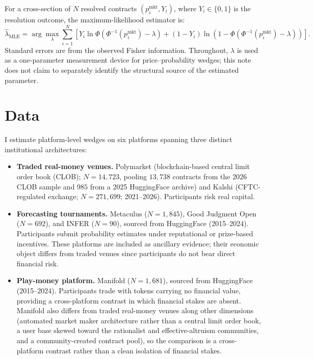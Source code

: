 \documentclass[12pt]{article}
\begin{document}
For a cross-section of $N$ resolved contracts $(p_i^{\mathrm{mkt}}, Y_i)$, where $Y_i \in \{0,1\}$ is the resolution outcome, the maximum-likelihood estimator is:
\[
\hat\lambda_{\mathrm{MLE}} = \arg\max_\lambda \sum_{i=1}^N \left[ Y_i \ln \Phi\!\left(\Phi^{-1}(p_i^{\mathrm{mkt}}) - \lambda\right) + (1 - Y_i) \ln\!\left(1 - \Phi\!\left(\Phi^{-1}(p_i^{\mathrm{mkt}}) - \lambda\right)\right) \right].
\]
Standard errors are from the observed Fisher information. Throughout, $\lambda$ is used as a one-parameter measurement device for price--probability wedges; this note does not claim to separately identify the structural source of the estimated parameter.

\section{Data}

I estimate platform-level wedges on six platforms spanning three distinct institutional architectures:

\begin{itemize}
\item \textbf{Traded real-money venues.} Polymarket (blockchain-based central limit order book (CLOB); $N = 14{,}723$, pooling $13{,}738$ contracts from the 2026 CLOB sample and $985$ from a 2025 HuggingFace archive) and Kalshi (CFTC-regulated exchange; $N = 271{,}699$; 2021--2026). Participants risk real capital.

\item \textbf{Forecasting tournaments.} Metaculus ($N = 1{,}845$), Good Judgment Open ($N = 692$), and INFER ($N = 90$), sourced from HuggingFace (2015--2024). Participants submit probability estimates under reputational or prize-based incentives. These platforms are included as ancillary evidence; their economic object differs from traded venues since participants do not bear direct financial risk.

\item \textbf{Play-money platform.} Manifold ($N = 1{,}681$), sourced from HuggingFace (2015--2024). Participants trade with tokens carrying no financial value, providing a cross-platform contrast in which financial stakes are absent. Manifold also differs from traded real-money venues along other dimensions (automated market maker architecture rather than a central limit order book, a user base skewed toward the rationalist and effective-altruism communities, and a community-created contract pool), so the comparison is a cross-platform contrast rather than a clean isolation of financial stakes.
\end{itemize}
\end{document}
